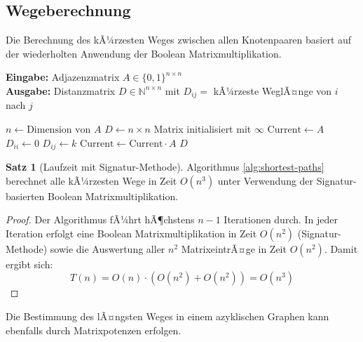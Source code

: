 ﻿\documentclass[a4paper,12pt]{article}
\theoremstyle{definition}
\newtheorem{satz}{Satz}
\begin{document}
	\subsection{Wegeberechnung}
	Die Berechnung des kÃ¼rzesten Weges zwischen allen Knotenpaaren basiert auf der wiederholten Anwendung der Boolean Matrixmultiplikation.
	
	\begin{algorithm}[H]
		\caption{KÃ¼rzeste Wege mit Boolean Matrixmultiplikation}
		\label{alg:shortest-paths}
		\textbf{Eingabe:} Adjazenzmatrix $A \in \{0,1\}^{n \times n}$ \\
		\textbf{Ausgabe:} Distanzmatrix $D \in \mathbb{N}^{n \times n}$ mit $D_{ij} = $ kÃ¼rzeste WeglÃ¤nge von $i$ nach $j$
		\begin{algorithmic}[1]
			\State $n \gets \text{Dimension von } A$
			\State $D \gets n \times n$ Matrix initialisiert mit $\infty$
			\State $\text{Current} \gets A$
			\State $D_{ii} \gets 0$ 
			\EndFor
			\State $D_{ij} \gets k$ 
			\EndIf
			\EndFor
			\EndFor
			\State $\text{Current} \gets \text{Current} \cdot A$ 
			\EndFor
			\State \Return $D$
		\end{algorithmic}
	\end{algorithm}
	
	\begin{satz}[Laufzeit mit Signatur-Methode]
		Algorithmus \ref{alg:shortest-paths} berechnet alle kÃ¼rzesten Wege in Zeit $O(n^3)$ unter Verwendung der Signatur-basierten Boolean Matrixmultiplikation.
	\end{satz}
	
	\begin{proof}
		Der Algorithmus fÃ¼hrt hÃ¶chstens $n-1$ Iterationen durch. In jeder Iteration erfolgt eine Boolean Matrixmultiplikation in Zeit $O(n^2)$ (Signatur-Methode) sowie die Auswertung aller $n^2$ MatrixeintrÃ¤ge in Zeit $O(n^2)$. Damit ergibt sich:
		\[
		T(n) = O(n) \cdot (O(n^2) + O(n^2)) = O(n^3)
		\]
	\end{proof}
	
	Die Bestimmung des lÃ¤ngsten Weges in einem azyklischen Graphen kann ebenfalls durch Matrixpotenzen erfolgen.
	
\end{document}
